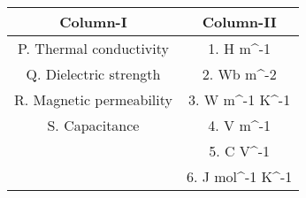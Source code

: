 \begin{tabular}{|c|c|} 
        \hline
        \textbf{Column-I} & \textbf{Column-II} \\
        \hline
         P. Thermal conductivity & 1. H m^{-1}\\
        \hline
        Q. Dielectric strength & 2. Wb m^{-2}\\
        \hline
        R. Magnetic permeability & 3. W m^{-1} K^{-1} \\
        \hline
        S. Capacitance & 4. V m^{-1} \\
        \hline
         & 5. C V^{-1} \\
        \hline
          & 6. J mol^{-1} K^{-1}\\
        \hline
    \end{tabular}
